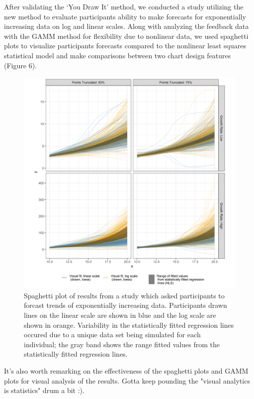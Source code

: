 \documentclass[
  letterpaper,
  DIV=11,
  numbers=noendperiod]{scrartcl}
\newcommand{\svp}[1]{{\textcolor{RedOrange}{#1}}}
\begin{document}
After validating the `You Draw It' method, we conducted a study
utilizing the new method to evaluate participants ability to make
forecasts for exponentially increasing data on log and linear scales.
Along with analyzing the feedback data with the GAMM method for
flexibility due to nonlinear data, we used spaghetti plots to visualize
participants forecasts compared to the nonlinear least squares
statistical model and make comparisons between two chart design features
(Figure 6).

\begin{figure}[ht]
\begin{center}
\centerline{\includegraphics[width=\columnwidth]{images/exponential-yloess-spaghetti-plot-2-1}}
\caption{Spaghetti plot of results from a study which asked participants to forcast trends of exponentially increasing data. Participants drawn lines on the linear scale are shown in blue and the log scale are shown in orange. Variability in the statistically fitted regression lines occured due to a unique data set being simulated for each individual; the gray band shows the range fitted values from the statistically fitted regression lines.}
\label{exponential-yloess-spaghetti-plot-2-1}
\end{center}
\end{figure}

\svp{It's also worth remarking on the effectiveness of the spaghetti plots and GAMM plots for visual analysis of the results. Gotta keep pounding the "visual analytics is statistics" drum a bit :). }
\end{document}
